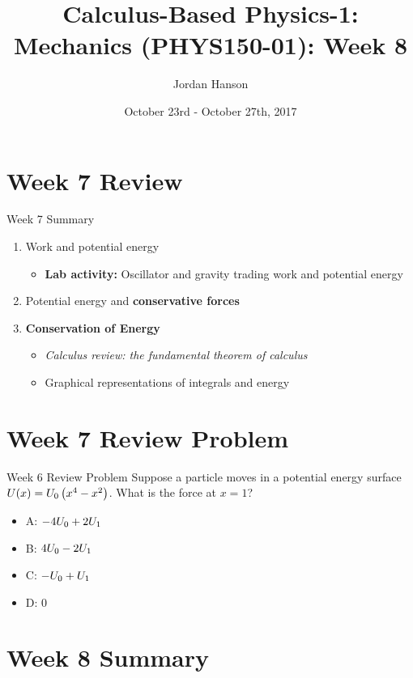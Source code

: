 \documentclass{beamer}
\title{Calculus-Based Physics-1: Mechanics (PHYS150-01): Week 8}
\date{October 23rd - October 27th, 2017}
\author{Jordan Hanson}
\institute{Whittier College Department of Physics and Astronomy}
\begin{document}
\maketitle

\section{Week 7 Review}

\begin{frame}{Week 7 Summary}
\begin{enumerate}
\item \alert{Work} and \alert{potential energy}
\begin{itemize}
\item \textbf{Lab activity:} Oscillator and gravity trading work and potential energy
\end{itemize}
\item Potential energy and \textbf{conservative forces}
\item \alert{\textbf{Conservation of Energy}}
\begin{itemize}
\item \textit{Calculus review: the fundamental theorem of calculus}
\item Graphical representations of integrals and energy
\end{itemize}
\end{enumerate}
\end{frame}

\section{Week 7 Review Problem}

\begin{frame}{Week 6 Review Problem}
Suppose a particle moves in a potential energy surface $U(x) = U_{\rm 0} \left( x^4 - x^2 \right)$.  What is the force at $x=1$?
\begin{itemize}
\item A: $-4U_{\rm 0} + 2U_{\rm 1}$
\item B: $4U_{\rm 0} - 2U_{\rm 1}$
\item C: $-U_{\rm 0} + U_{\rm 1}$
\item D: $0$
\end{itemize}
\end{frame}

\section{Week 8 Summary}
\end{document}

